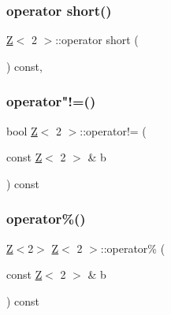 \subsubsection{\texorpdfstring{operator short()}{operator short()}}
{\footnotesize\ttfamily \hyperlink{classZ}{Z}$<$ 2 $>$\+::operator short (\begin{DoxyParamCaption}{ }\end{DoxyParamCaption}) const\hspace{0.3cm}{\ttfamily [inline]}, {\ttfamily [explicit]}}

\mbox{\label{classZ_3_012_01_4_a0003dbeab72988aea1e4b8034f5fa29d}} 
\subsubsection{\texorpdfstring{operator"!=()}{operator!=()}}
{\footnotesize\ttfamily bool \hyperlink{classZ}{Z}$<$ 2 $>$\+::operator!= (\begin{DoxyParamCaption}\item[{const \hyperlink{classZ}{Z}$<$ 2 $>$ \&}]{b }\end{DoxyParamCaption}) const\hspace{0.3cm}{\ttfamily [inline]}}

\mbox{\label{classZ_3_012_01_4_a665bdbcbcf9b9787d7bcf40c6a716ec3}} 
\subsubsection{\texorpdfstring{operator\%()}{operator\%()}}
{\footnotesize\ttfamily \hyperlink{classZ}{Z}$<$2$>$ \hyperlink{classZ}{Z}$<$ 2 $>$\+::operator\% (\begin{DoxyParamCaption}\item[{const \hyperlink{classZ}{Z}$<$ 2 $>$ \&}]{b }\end{DoxyParamCaption}) const\hspace{0.3cm}{\ttfamily [inline]}}

\mbox{\label{classZ_3_012_01_4_acb91754a2634eee60b51ea29b8cfe347}} 
